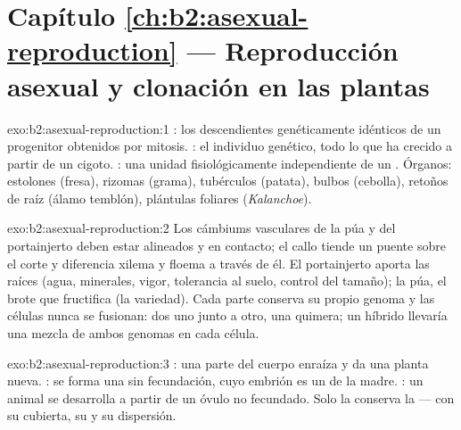 \section*{Capítulo \ref{ch:b2:asexual-reproduction} --- Reproducción asexual y clonación en las plantas}

\begin{solution}{exo:b2:asexual-reproduction:1}
: los descendientes genéticamente idénticos de un progenitor
obtenidos por mitosis. : el individuo genético, todo lo que ha
crecido a partir de un cigoto. : una unidad fisiológicamente
independiente de un . Órganos: estolones (fresa), rizomas (grama),
tubérculos (patata), bulbos (cebolla), retoños de raíz (álamo temblón),
plántulas foliares (\emph{Kalanchoe}).
\end{solution}

\begin{solution}{exo:b2:asexual-reproduction:2}
Los cámbiums vasculares de la púa y del portainjerto deben estar alineados
y en contacto; el callo tiende un puente sobre el corte y diferencia
xilema y floema a través de él. El portainjerto aporta las raíces (agua,
minerales, vigor, tolerancia al suelo, control del tamaño); la púa, el
brote que fructifica (la variedad). Cada parte conserva su propio genoma
y las células nunca se fusionan: dos  uno junto a otro, una
quimera; un híbrido llevaría una mezcla de ambos genomas en cada célula.
\end{solution}

\begin{solution}{exo:b2:asexual-reproduction:3}
: una parte del cuerpo enraíza y da una planta
nueva. : se forma una  sin fecundación, cuyo embrión es un
 de la madre. : un animal se desarrolla a partir de un
óvulo no fecundado. Solo la  conserva la  --- con su
cubierta, su  y su dispersión.
\end{solution}

